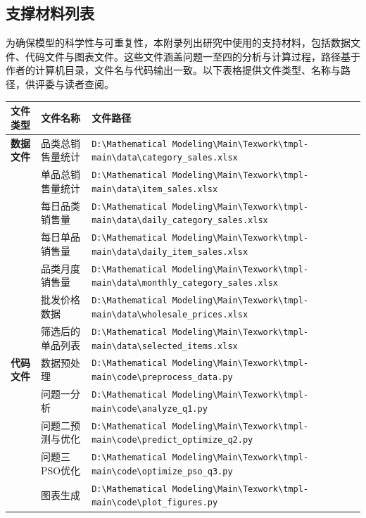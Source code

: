 \documentclass{cumcmthesis} %
\begin{document}
\newpage
\begin{appendices}

    \section{支撑材料列表}
    
    为确保模型的科学性与可重复性，本附录列出研究中使用的支持材料，包括数据文件、代码文件与图表文件。这些文件涵盖问题一至四的分析与计算过程，路径基于作者的计算机目录，文件名与代码输出一致。以下表格提供文件类型、名称与路径，供评委与读者查阅。
\begin{center}
    \begin{longtable}{p{2cm}<{\centering} p{5cm}<{\centering} p{8cm}<{\centering}}
        \toprule[1.5pt]
        \textbf{文件类型} & \textbf{文件名称} & \textbf{文件路径} \\
        \midrule
        \endhead %
        
        \textbf{数据文件} & 品类总销售量统计 & \verb|D:\Mathematical Modeling\Main\Texwork\tmpl-main\data\category_sales.xlsx| \\
        & 单品总销售量统计 & \verb|D:\Mathematical Modeling\Main\Texwork\tmpl-main\data\item_sales.xlsx| \\
        & 每日品类销售量 & \verb|D:\Mathematical Modeling\Main\Texwork\tmpl-main\data\daily_category_sales.xlsx| \\
        & 每日单品销售量 & \verb|D:\Mathematical Modeling\Main\Texwork\tmpl-main\data\daily_item_sales.xlsx| \\
        & 品类月度销售量 & \verb|D:\Mathematical Modeling\Main\Texwork\tmpl-main\data\monthly_category_sales.xlsx| \\
        & 批发价格数据 & \verb|D:\Mathematical Modeling\Main\Texwork\tmpl-main\data\wholesale_prices.xlsx| \\
        & 筛选后的单品列表 & \verb|D:\Mathematical Modeling\Main\Texwork\tmpl-main\data\selected_items.xlsx| \\
        
        \midrule
        \textbf{代码文件} & 数据预处理 & \verb|D:\Mathematical Modeling\Main\Texwork\tmpl-main\code\preprocess_data.py| \\
        & 问题一分析 & \verb|D:\Mathematical Modeling\Main\Texwork\tmpl-main\code\analyze_q1.py| \\
        & 问题二预测与优化 & \verb|D:\Mathematical Modeling\Main\Texwork\tmpl-main\code\predict_optimize_q2.py| \\
        & 问题三PSO优化 & \verb|D:\Mathematical Modeling\Main\Texwork\tmpl-main\code\optimize_pso_q3.py| \\
        & 图表生成 & \verb|D:\Mathematical Modeling\Main\Texwork\tmpl-main\code\plot_figures.py| \\
        

\end{longtable}
\end{center}
\end{appendices}
\end{document}
